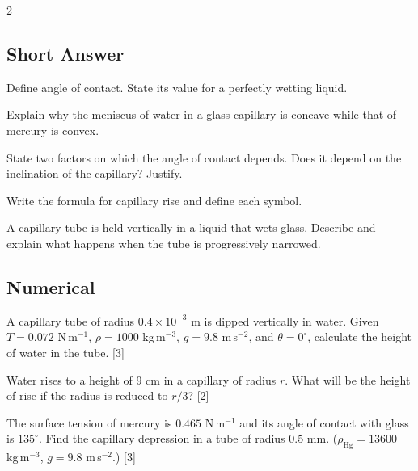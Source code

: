 \documentclass[12pt, a4paper]{exam}
\begin{document}
\begin{multicols}{2}

\subsection*{Short Answer}

\begin{questions}

\question Define angle of contact. State its value for a perfectly wetting liquid. \dotfill \hfill\makebox[1.5cm]{\dotfill}
\vspace{2em}

\question Explain why the meniscus of water in a glass capillary is concave while that of mercury is convex.
\vspace{3em}

\question State two factors on which the angle of contact depends. Does it depend on the inclination of the capillary? Justify.
\vspace{3em}

\question Write the formula for capillary rise and define each symbol. \hfill\makebox[1.5cm]{\dotfill}
\vspace{2em}

\question A capillary tube is held vertically in a liquid that wets glass. Describe and explain what happens when the tube is progressively narrowed.
\vspace{3em}

\subsection*{Numerical}

\question A capillary tube of radius $0.4 \times 10^{-3}$ m is dipped vertically in water. Given $T = 0.072$ N\,m$^{-1}$, $\rho = 1000$ kg\,m$^{-3}$, $g = 9.8$ m\,s$^{-2}$, and $\theta = 0^\circ$, calculate the height of water in the tube. \hfill[3]

\vspace{4em}

\question Water rises to a height of 9 cm in a capillary of radius $r$. What will be the height of rise if the radius is reduced to $r/3$? \hfill[2]

\vspace{3em}

\question The surface tension of mercury is $0.465$ N\,m$^{-1}$ and its angle of contact with glass is $135^\circ$. Find the capillary depression in a tube of radius $0.5$ mm. ($\rho_{\text{Hg}} = 13600$ kg\,m$^{-3}$, $g = 9.8$ m\,s$^{-2}$.) \hfill[3]


\end{questions}
\end{multicols}
\end{document}
